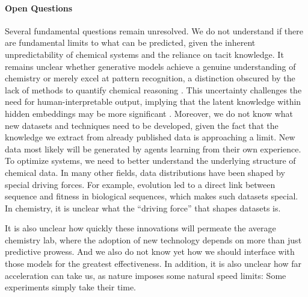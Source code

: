 \paragraph{Open Questions} Several fundamental questions remain unresolved. We do not understand if there are fundamental limits to what can be predicted, given the inherent unpredictability of chemical systems and the reliance on tacit knowledge. It remains unclear whether generative models achieve a genuine understanding of chemistry or merely excel at pattern recognition, a distinction obscured by the lack of methods to quantify chemical reasoning \autocite{alampara2024probing}. This uncertainty challenges the need for human-interpretable output, implying that the latent knowledge within hidden embeddings may be more significant \autocite{hao2024training}. Moreover, we do not know what new datasets and techniques need to be developed, given the fact that the knowledge we extract from already published data is approaching a limit.\autocite{silver2025welcome} New data most likely will be generated by agents learning from their own experience.
To optimize systems, we need to better understand the underlying structure of chemical data.
In many other fields, data distributions have been shaped by special driving forces. 
For example, evolution led to a direct link between sequence and fitness in biological sequences, which makes such datasets special. In chemistry, it is unclear what the \enquote{driving force} that shapes datasets is. 

It is also unclear how quickly these innovations will permeate the average chemistry lab, where the adoption of new technology depends on more than just predictive prowess. 
And we also do not know yet how we should interface with those models for the greatest effectiveness.
In addition, it is also unclear how far acceleration can take us, as nature imposes some natural speed limits: Some experiments simply take their time. 

